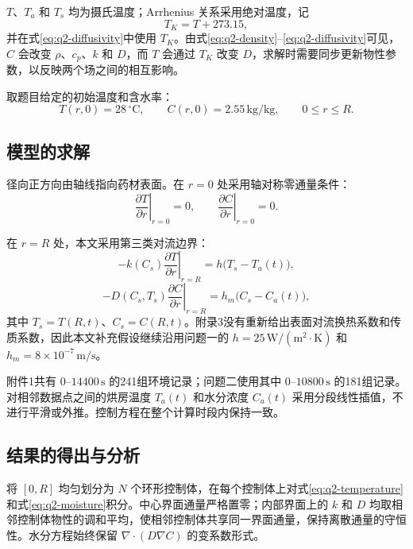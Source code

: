 $T$、$T_a$ 和 $T_s$ 均为摄氏温度；Arrhenius 关系采用绝对温度，记
\begin{equation}
T_K=T+273.15,
\label{eq:q2-kelvin}
\end{equation}
并在式\eqref{eq:q2-diffusivity}中使用 $T_K$。由式\eqref{eq:q2-density}--\eqref{eq:q2-diffusivity}可见，$C$ 会改变 $\rho$、$c_p$、$k$ 和 $D$，而 $T$ 会通过 $T_K$ 改变 $D$，求解时需要同步更新物性参数，以反映两个场之间的相互影响。

取题目给定的初始温度和含水率：
\begin{equation}
T(r,0)=28\,{}^\circ\mathrm{C},
\qquad
C(r,0)=2.55\,\mathrm{kg/kg},
\qquad 0\le r\le R.
\label{eq:q2-initial}
\end{equation}

\subsection{模型的求解}

径向正方向由轴线指向药材表面。在 $r=0$ 处采用轴对称零通量条件：
\begin{equation}
\left.\frac{\partial T}{\partial r}\right|_{r=0}=0,
\qquad
\left.\frac{\partial C}{\partial r}\right|_{r=0}=0.
\label{eq:q2-center-bc}
\end{equation}

在 $r=R$ 处，本文采用第三类对流边界：
\begin{equation}
-k(C_s)\left.\frac{\partial T}{\partial r}\right|_{r=R}
=h\bigl(T_s-T_a(t)\bigr),
\label{eq:q2-thermal-bc}
\end{equation}
\begin{equation}
-D(C_s,T_s)\left.\frac{\partial C}{\partial r}\right|_{r=R}
=h_m\bigl(C_s-C_a(t)\bigr),
\label{eq:q2-moisture-bc}
\end{equation}
其中 $T_s=T(R,t)$、$C_s=C(R,t)$。附录3没有重新给出表面对流换热系数和传质系数，因此本文补充假设继续沿用问题一的 $h=25\,\mathrm{W/(m^2\cdot K)}$ 和 $h_m=8\times10^{-7}\,\mathrm{m/s}$。

附件1共有 $0$--$14400\,\mathrm{s}$ 的241组环境记录；问题二使用其中 $0$--$10800\,\mathrm{s}$ 的181组记录。对相邻数据点之间的烘房温度 $T_a(t)$ 和水分浓度 $C_a(t)$ 采用分段线性插值，不进行平滑或外推。控制方程在整个计算时段内保持一致。

\subsection{结果的得出与分析}

将 $[0,R]$ 均匀划分为 $N$ 个环形控制体，在每个控制体上对式\eqref{eq:q2-temperature}和式\eqref{eq:q2-moisture}积分。中心界面通量严格置零；内部界面上的 $k$ 和 $D$ 均取相邻控制体物性的调和平均，使相邻控制体共享同一界面通量，保持离散通量的守恒性。水分方程始终保留 $\nabla\cdot(D\nabla C)$ 的变系数形式。


